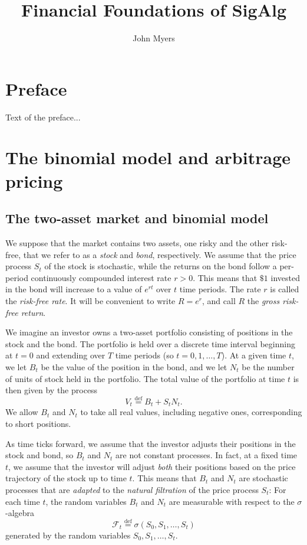 \documentclass[11pt, openany, oneside]{book}
\title{Financial Foundations of SigAlg}
\author{John Myers}
\theoremstyle{definition}
\theoremstyle{remark}
\theoremstyle{boldital}
\numberwithin{equation}{section}
\begin{document}
\frontmatter
\maketitle

\chapter*{Preface}
Text of the preface...

\tableofcontents

\mainmatter

\chapter{The binomial model and arbitrage pricing}

\section{The two-asset market and binomial model}

We suppose that the market contains two assets, one risky and the other risk-free, that we refer to as a \textit{stock} and \textit{bond}, respectively. We assume that the price process $S_t$ of the stock is stochastic, while the returns on the bond follow a per-period continuously compounded interest rate $r>0$. This means that $\$1$ invested in the bond will increase to a value of $e^{rt}$ over $t$ time periods. The rate $r$ is called the \textit{risk-free rate}. It will be convenient to write $R=e^r$, and call $R$ the \textit{gross risk-free return}.

We imagine an investor owns a two-asset portfolio consisting of positions in the stock and the bond. The portfolio is held over a discrete time interval beginning at $t=0$ and extending over $T$ time periods (so $t=0,1,\ldots,T$). At a given time $t$, we let $B_t$ be the value of the position in the bond, and we let $N_t$ be the number of units of stock held in the portfolio. The total value of the portfolio at time $t$ is then given by the process
	\[
	V_t \stackrel{\text{def}}{=} B_t + S_t N_t.
	\]
We allow $B_t$ and $N_t$ to take all real values, including negative ones, corresponding to short positions. 

As time ticks forward, we assume that the investor adjusts their positions in the stock and bond, so $B_t$ and $N_t$ are not constant processes. In fact, at a fixed time $t$, we assume that the investor will adjust \textit{both} their positions based on the price trajectory of the stock up to time $t$. This means that $B_t$ and $N_t$ are stochastic processes that are \textit{adapted} to the \textit{natural filtration} of the price process $S_t$: For each time $t$, the random variables $B_t$ and $N_t$ are measurable with respect to the $\sigma$-algebra
	\begin{equation}\label{eq:natural-filt}
	\mathcal{F}_t \stackrel{\text{def}}{=} \sigma(S_0,S_1,\ldots,S_t)
	\end{equation}
generated by the random variables $S_0,S_1,\ldots,S_t$.
\end{document}
